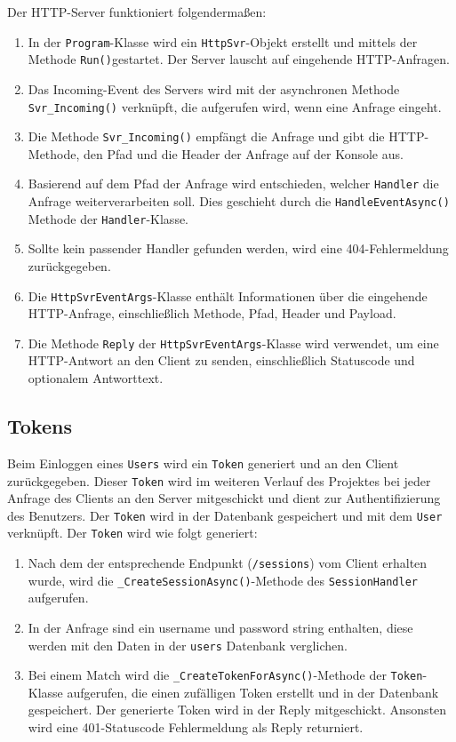 \documentclass[a4paper, 12pt]{article}
\begin{document}
Der HTTP-Server funktioniert folgendermaßen:
\begin{enumerate}
    \item In der \texttt{Program}-Klasse wird ein \texttt{HttpSvr}-Objekt erstellt und mittels der Methode \texttt{Run()}gestartet. Der Server lauscht auf eingehende HTTP-Anfragen.
    \item Das Incoming-Event des Servers wird mit der asynchronen Methode \texttt{Svr\_Incoming()} verknüpft, die aufgerufen wird, wenn eine Anfrage eingeht.
    \item Die Methode \texttt{Svr\_Incoming()} empfängt die Anfrage und gibt die HTTP-Methode, den Pfad und die Header der Anfrage auf der Konsole aus.
    \item Basierend auf dem Pfad der Anfrage wird entschieden, welcher \texttt{Handler} die Anfrage weiterverarbeiten soll. Dies geschieht durch die \texttt{HandleEventAsync()} Methode der \texttt{Handler}-Klasse.
    \item Sollte kein passender Handler gefunden werden, wird eine 404-Fehlermeldung zurückgegeben.
    \item Die \texttt{HttpSvrEventArgs}-Klasse enthält Informationen über die eingehende HTTP-Anfrage, einschließlich Methode, Pfad, Header und Payload.
    \item Die Methode \texttt{Reply} der \texttt{HttpSvrEventArgs}-Klasse wird verwendet, um eine HTTP-Antwort an den Client zu senden, einschließlich Statuscode und optionalem Antworttext.
\end{enumerate}

\subsection{Tokens}
Beim Einloggen eines \texttt{Users} wird ein \texttt{Token} generiert und an den Client zurückgegeben. Dieser \texttt{Token} wird im weiteren Verlauf des Projektes bei jeder Anfrage des Clients an den Server mitgeschickt und dient zur Authentifizierung des Benutzers. Der \texttt{Token} wird in der Datenbank gespeichert und mit dem \texttt{User} verknüpft. Der \texttt{Token} wird wie folgt generiert:
\begin{enumerate}
    \item Nach dem der entsprechende Endpunkt (\texttt{/sessions}) vom Client erhalten wurde, wird die \texttt{\_CreateSessionAsync()}-Methode des \texttt{SessionHandler} aufgerufen.
    \item In der Anfrage sind ein username und password string enthalten, diese werden mit den Daten in der \texttt{users} Datenbank verglichen.
    \item Bei einem Match wird die \texttt{\_CreateTokenForAsync()}-Methode der \texttt{Token}-Klasse aufgerufen, die einen zufälligen Token erstellt und in der Datenbank gespeichert. Der generierte Token wird in der Reply mitgeschickt. Ansonsten wird eine 401-Statuscode Fehlermeldung als Reply returniert.
\end{enumerate}
\end{document}
